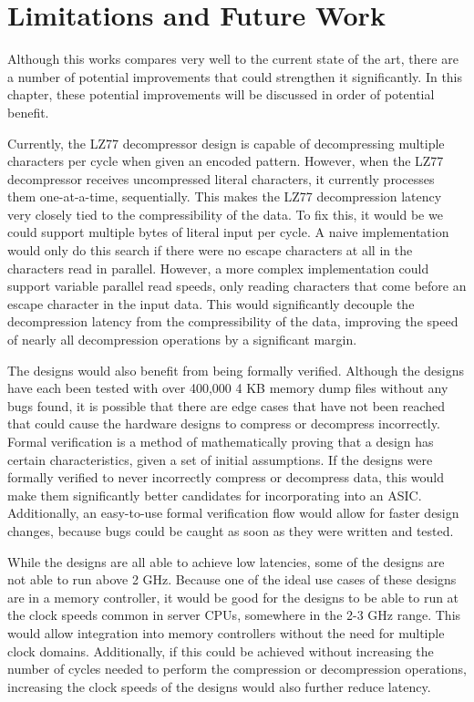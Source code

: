 \documentclass[doublespace,nopageskip]{VTthesis}
\begin{document}
\chapter{Limitations and Future Work} \label{ch:discussion}
Although this works compares very well to the current state of the art, there are a number of potential improvements that could strengthen it significantly. In this chapter, these potential improvements will be discussed in order of potential benefit.

Currently, the LZ77 decompressor design is capable of decompressing multiple characters per cycle when given an encoded pattern. However, when the LZ77 decompressor receives uncompressed literal characters, it currently processes them one-at-a-time, sequentially. This makes the LZ77 decompression latency very closely tied to the compressibility of the data. To fix this, it would be we could support multiple bytes of literal input per cycle. A naive implementation would only do this search if there were no escape characters at all in the characters read in parallel. However, a more complex implementation could support variable parallel read speeds, only reading characters that come before an escape character in the input data. This would significantly decouple the decompression latency from the compressibility of the data, improving the speed of nearly all decompression operations by a significant margin.

The designs would also benefit from being formally verified. Although the designs have each been tested with over 400,000 4 KB memory dump files without any bugs found, it is possible that there are edge cases that have not been reached that could cause the hardware designs to compress or decompress incorrectly. Formal verification is a method of mathematically proving that a design has certain characteristics, given a set of initial assumptions. If the designs were formally verified to never incorrectly compress or decompress data, this would make them significantly better candidates for incorporating into an ASIC. Additionally, an easy-to-use formal verification flow would allow for faster design changes, because bugs could be caught as soon as they were written and tested.

While the designs are all able to achieve low latencies, some of the designs are not able to run above 2 GHz. Because one of the ideal use cases of these designs are in a memory controller, it would be good for the designs to be able to run at the clock speeds common in server CPUs, somewhere in the 2-3 GHz range. This would allow integration into memory controllers without the need for multiple clock domains. Additionally, if this could be achieved without increasing the number of cycles needed to perform the compression or decompression operations, increasing the clock speeds of the designs would also further reduce latency.
\end{document}

